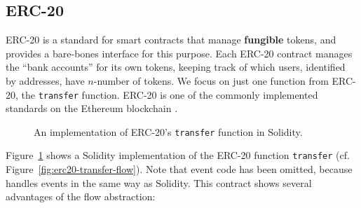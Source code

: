 \documentclass[dvipsnames, usenames, sigconf]{acmart}
\begin{document}
\subsection{ERC-20}
ERC-20  is a standard for smart contracts that manage \textbf{fungible} tokens, and provides a bare-bones interface for this purpose.
Each ERC-20 contract manages the ``bank accounts'' for its own tokens, keeping track of which users, identified by addresses, have $n$-number of tokens.
We focus on just one function from ERC-20, the \lstinline{transfer} function.
ERC-20 is one of the commonly implemented standards on the Ethereum blockchain .
%         
%         
\begin{figure}[h]
    \centering
    
    \caption{An implementation of ERC-20's \lstinline{transfer} function in Solidity.}
    \label{fig:erc20-transfer-sol}
\end{figure}
Figure~\ref{fig:erc20-transfer-sol} shows a Solidity implementation of the ERC-20 function \lstinline{transfer} (cf. Figure~\ref{fig:erc20-transfer-flow}).
Note that event code has been omitted, because \langName handles events in the same way as Solidity.
This contract shows several advantages of the flow abstraction:
\end{document}
